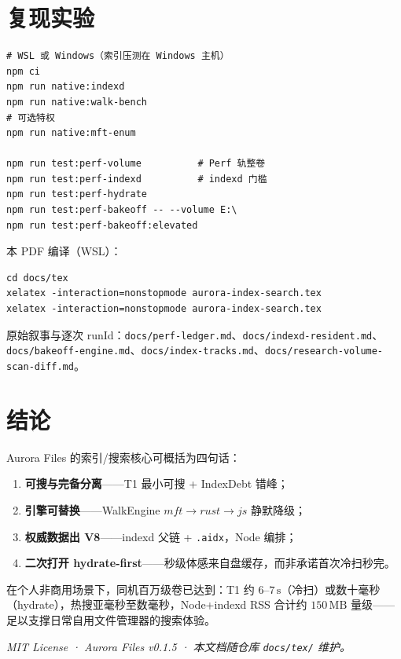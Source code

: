 \documentclass[UTF8,a4paper,11pt]{ctexart}
\begin{document}
\section{复现实验}

\begin{lstlisting}
# WSL 或 Windows（索引压测在 Windows 主机）
npm ci
npm run native:indexd
npm run native:walk-bench
# 可选特权
npm run native:mft-enum

npm run test:perf-volume          # Perf 轨整卷
npm run test:perf-indexd          # indexd 门槛
npm run test:perf-hydrate
npm run test:perf-bakeoff -- --volume E:\
npm run test:perf-bakeoff:elevated
\end{lstlisting}

本 PDF 编译（WSL）：
\begin{lstlisting}
cd docs/tex
xelatex -interaction=nonstopmode aurora-index-search.tex
xelatex -interaction=nonstopmode aurora-index-search.tex
\end{lstlisting}

原始叙事与逐次 runId：\texttt{docs/perf-ledger.md}、\texttt{docs/indexd-resident.md}、\texttt{docs/bakeoff-engine.md}、\texttt{docs/index-tracks.md}、\texttt{docs/research-volume-scan-diff.md}。

\section{结论}

Aurora Files 的索引/搜索核心可概括为四句话：
\begin{enumerate}[leftmargin=1.6em]
  \item \textbf{可搜与完备分离}——T1 最小可搜 + IndexDebt 错峰；
  \item \textbf{引擎可替换}——WalkEngine $mft\to rust\to js$ 静默降级；
  \item \textbf{权威数据出 V8}——indexd 父链 + \texttt{.aidx}，Node 编排；
  \item \textbf{二次打开 hydrate-first}——秒级体感来自盘缓存，而非承诺首次冷扫秒完。
\end{enumerate}
在个人非商用场景下，同机百万级卷已达到：T1 约 $6$–$7\,\mathrm{s}$（冷扫）或数十毫秒（hydrate），热搜亚毫秒至数毫秒，Node+indexd RSS 合计约 $150\,\mathrm{MB}$ 量级——足以支撑日常自用文件管理器的搜索体验。

\vspace{1.5em}
\noindent\textit{MIT License · Aurora Files v0.1.5 · 本文档随仓库 \texttt{docs/tex/} 维护。}
\end{document}
